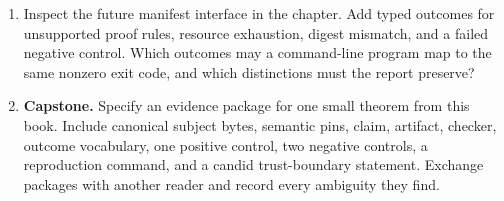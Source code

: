 \begin{enumerate}
\item Inspect the future manifest interface in the chapter. Add typed outcomes
for unsupported proof rules, resource exhaustion, digest mismatch, and a
failed negative control. Which outcomes may a command-line program map to the
same nonzero exit code, and which distinctions must the report preserve?

\item \textbf{Capstone.} Specify an evidence package for one small theorem
from this book. Include canonical subject bytes, semantic pins, claim,
artifact, checker, outcome vocabulary, one positive control, two negative
controls, a reproduction command, and a candid trust-boundary statement.
Exchange packages with another reader and record every ambiguity they find.
\end{enumerate}
